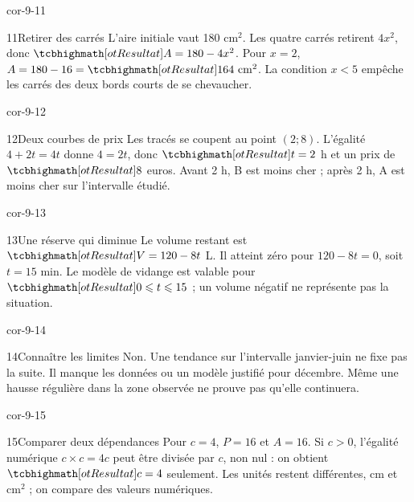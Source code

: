 \begin{blocLivre}{cor-9-11}\begin{corrige}{11}{Retirer des carrés}
L’aire initiale vaut 180 cm$^2$. Les quatre carrés retirent $4x^2$, donc $\res{A=180-4x^2}$. Pour $x=2$, $A=180-16=\res{164\ \mathrm{cm}^2}$. La condition $x<5$ empêche les carrés des deux bords courts de se chevaucher.
\label{fig-cor-9-11}
\end{corrige}\end{blocLivre}
\begin{blocLivre}{cor-9-12}\begin{corrige}{12}{Deux courbes de prix}
Les tracés se coupent au point $(2;8)$. L’égalité $4+2t=4t$ donne $4=2t$, donc $\res{t=2}$ h et un prix de $\res8$ euros. Avant 2 h, B est moins cher ; après 2 h, A est moins cher sur l’intervalle étudié.
\label{fig-cor-9-12}
\end{corrige}\end{blocLivre}
\begin{blocLivre}{cor-9-13}\begin{corrige}{13}{Une réserve qui diminue}
Le volume restant est $\res{V=120-8t}$ L. Il atteint zéro pour $120-8t=0$, soit $t=15$ min. Le modèle de vidange est valable pour $\res{0\le t\le15}$ ; un volume négatif ne représente pas la situation.
\label{fig-cor-9-13}
\end{corrige}\end{blocLivre}
\begin{blocLivre}{cor-9-14}\begin{corrige}{14}{Connaître les limites}
Non. Une tendance sur l’intervalle janvier-juin ne fixe pas la suite. Il manque les données ou un modèle justifié pour décembre. Même une hausse régulière dans la zone observée ne prouve pas qu’elle continuera.
\end{corrige}\end{blocLivre}
\begin{blocLivre}{cor-9-15}\begin{corrige}{15}{Comparer deux dépendances}
Pour $c=4$, $P=16$ et $A=16$. Si $c>0$, l’égalité numérique $c\times c=4c$ peut être divisée par $c$, non nul : on obtient $\res{c=4}$ seulement. Les unités restent différentes, cm et cm$^2$ ; on compare des valeurs numériques.
\label{fig-cor-9-15}
\end{corrige}\end{blocLivre}
